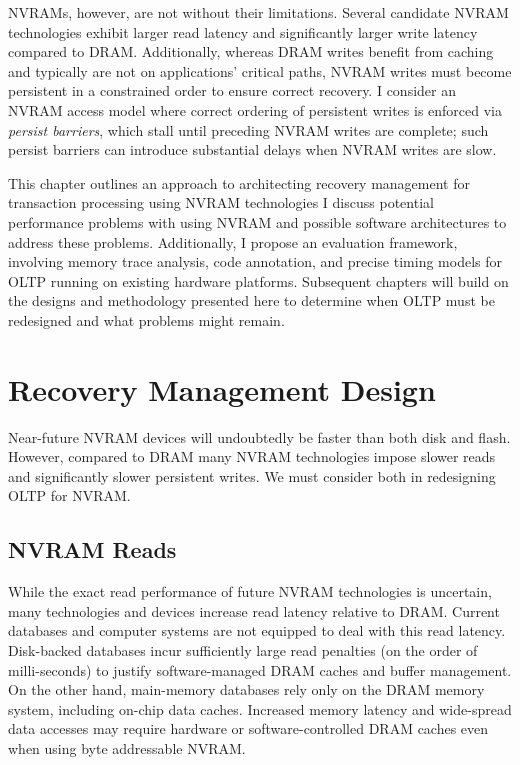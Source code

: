 NVRAMs, however, are not without their limitations.
Se\-veral candidate NVRAM technologies exhibit larger read latency and significantly larger write latency compared to DRAM.
Additionally, whereas DRAM writes benefit from caching and typically are not on applications' critical paths, NVRAM writes must become persistent in a constrained order to ensure correct recovery.
I consider an NVRAM access model where correct ordering of persistent writes is enforced via \emph{persist barriers}, which stall until preceding NVRAM writes are complete; such persist barriers can introduce substantial delays when NVRAM writes are slow.

This chapter outlines an approach to architecting recovery management for transaction processing using NVRAM technologies
I discuss potential performance problems with using NVRAM and possible software architectures to address these problems.
Additionally, I propose an evaluation framework, involving memory trace analysis, code annotation, and precise timing models for OLTP running on existing hardware platforms.
Subsequent chapters will build on the designs and methodology presented here to determine when OLTP must be redesigned and what problems might remain.

\section{Recovery Management Design}
\label{sec:OLTP_design:Design}



Near-future NVRAM devices will undoubtedly be faster than both disk and flash.
However, compared to DRAM many NVRAM technologies impose slower reads and significantly slower persistent writes.
We must consider both in redesigning OLTP for NVRAM.

\subsection{NVRAM Reads}
\label{sect:OLTP_design:Design:Reads}
While the exact read performance of future NVRAM technologies is uncertain, many technologies and devices increase read latency relative to DRAM.
Current databases and computer systems are not equipped to deal with this read latency.
Disk-backed databases incur sufficiently large read penalties (on the order of milli-seconds) to justify software-managed DRAM caches and buffer management.
On the other hand, main-memory databases rely only on the DRAM memory system, including on-chip data caches.
Increased memory latency and wide-spread data accesses may require hardware or software-controlled DRAM caches even when using byte addressable NVRAM.

